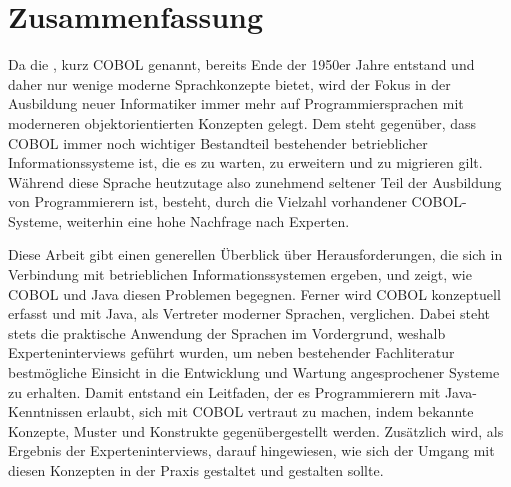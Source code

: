 \chapter*{Zusammenfassung} 

Da die , kurz \mbox{COBOL} genannt, bereits Ende der 1950er Jahre entstand und daher nur wenige moderne Sprachkonzepte bietet, wird der Fokus in der Ausbildung neuer Informatiker immer mehr auf Programmiersprachen mit moderneren objektorientierten Konzepten gelegt. Dem steht gegenüber, dass COBOL immer noch wichtiger Bestandteil bestehender betrieblicher Informationssysteme ist, die es zu warten, zu erweitern und zu migrieren gilt. Während diese Sprache heutzutage also zunehmend seltener Teil der Ausbildung von Programmierern ist, besteht, durch die Vielzahl vorhandener COBOL-Systeme, weiterhin eine hohe Nachfrage nach Experten.

Diese Arbeit gibt einen generellen Überblick über Herausforderungen, die sich in Verbindung mit betrieblichen Informationssystemen ergeben, und zeigt, wie COBOL und Java diesen Problemen begegnen. Ferner wird COBOL konzeptuell erfasst und mit Java, als Vertreter moderner Sprachen, verglichen. Dabei steht stets die praktische Anwendung der Sprachen im Vordergrund, weshalb Experteninterviews geführt wurden, um neben bestehender Fachliteratur bestmögliche Einsicht in die Entwicklung und Wartung angesprochener Systeme zu erhalten. Damit entstand ein Leitfaden, der es Programmierern mit Java-Kenntnissen erlaubt, sich mit COBOL vertraut zu machen, indem bekannte Konzepte, Muster und Konstrukte gegenübergestellt werden. Zusätzlich wird, als Ergebnis der Experteninterviews, darauf hingewiesen, wie sich der Umgang mit diesen Konzepten in der Praxis gestaltet und gestalten sollte. 